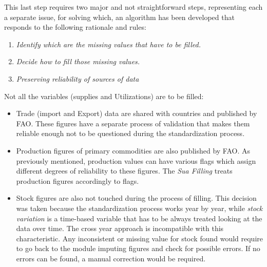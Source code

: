 \documentclass[]{article}
\providecommand{\tightlist}{%
  \setlength{\itemsep}{0pt}\setlength{\parskip}{0pt}}
\begin{document}
This last step requires two major and not straightforward steps,
representing each a separate issue, for solving which, an algorithm has
been developed that responds to the following rationale and rules:

\begin{enumerate}
\def\labelenumi{\arabic{enumi}.}
\tightlist
\item
  \emph{Identify which are the missing values that have to be filled.}
\item
  \emph{Decide how to fill those missing values.}
\item
  \emph{Preserving reliability of sources of data}
\end{enumerate}

Not all the variables (supplies and Utilizations) are to be filled:

\begin{itemize}
\tightlist
\item
  Trade (import and Export) data are shared with countries and published
  by FAO. These figures have a separate process of validation that makes
  them reliable enough not to be questioned during the standardization
  process.
\item
  Production figures of primary commodities are also published by FAO.
  As previously mentioned, production values can have various flags
  which assign different degrees of reliability to these figures. The
  \emph{Sua Filling} treats production figures accordingly to flags.
\item
  Stock figures are also not touched during the process of filling. This
  decision was taken because the standardization process works year by
  year, while \emph{stock variation} is a time-based variable that has
  to be always treated looking at the data over time. The cross year
  approach is incompatible with this characteristic. Any inconsistent or
  missing value for stock found would require to go back to the module
  imputing figures and check for possible errors. If no errors can be
  found, a manual correction would be required.
\end{itemize}
\end{document}
